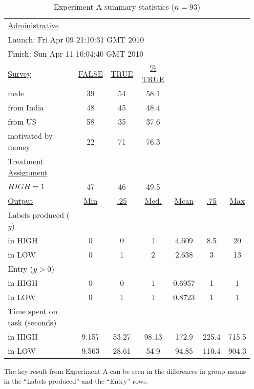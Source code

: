 \documentclass[12pt]{article}
\begin{document}
\begin{table}[h!]
  \begin{center} 
   \caption{Experiment A summary statistics ($n=93$) 
     \label{tab:ExpA.ss}}
\begin{tabular}{lcccccc}
  \toprule 
  \underline{Administrative} \\
    \multicolumn{4}{l}{\hspace{10pt} Launch: Fri Apr 09 21:10:31 GMT 2010} \\
    \multicolumn{4}{l}{\hspace{10pt} Finish:  Sun Apr 11 10:04:40 GMT 2010} \\[5pt] 
  \underline{Survey}    & \underline{FALSE} & \underline{TRUE} & \underline{\% TRUE}   \\
  \hspace{10pt} male                  & 39 & 54 & 58.1  \\
  \hspace{10pt} from India                 & 48 & 45 & 48.4  \\
  \hspace{10pt} from US                    & 58 & 35 & 37.6  \\
  \hspace{10pt} motivated by money                 & 22 & 71 & 76.3  \\[5pt]
  \underline{Treatment Assignment} \\ 
  \hspace{10pt} $HIGH=1$                & 47 & 46 & 49.5  \\[5pt]
 
  \underline{Output} &  \underline{Min} & \underline{.25} & \underline{Med.} & \underline{Mean} & \underline{.75} & \underline{Max}\\ 
 
  Labels produced ($y$) \\
  \hspace{10pt} in HIGH           & 0 & 0 & 1 & 4.609 & 8.5 & 20\\
  \hspace{10pt} in LOW            & 0 & 1 & 2 & 2.638 & 3 & 13\\
  Entry ($y > 0$) \\
  \hspace{10pt} in HIGH           & 0 & 0 & 1 & 0.6957 & 1 & 1\\
  \hspace{10pt} in LOW            & 0 & 1 & 1 & 0.8723 & 1 & 1\\
  Time spent on task (seconds) \\ 
  \hspace{10pt} in HIGH     & 9.157 & 53.27 & 98.13 & 172.9 & 225.4 & 715.5  \\
  \hspace{10pt} in LOW      & 9.563 & 28.61 & 54.9 & 94.85 & 110.4 & 904.3  \\
  \bottomrule 
  \end{tabular}
\end{center} 
The key result from Experiment A can be seen in the differences in
group means in the ``Labels produced'' and the ``Entry'' rows.
\end{table} 
\end{document}
